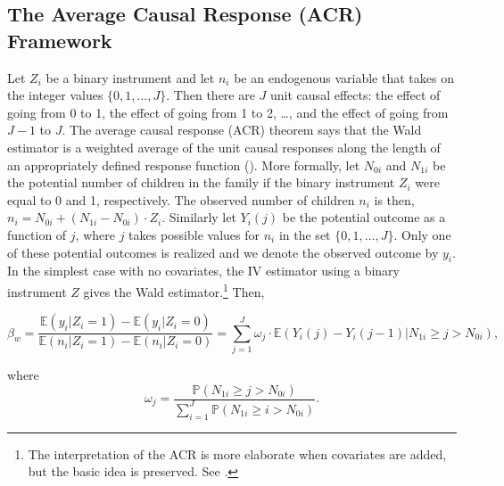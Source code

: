 
\subsection{The Average Causal Response (ACR) Framework}
\label{section:acr-detail}

Let $ Z_{i} $ be a binary instrument and let $ n_{i} $ be an endogenous variable that takes on the integer values $ \{0, 1, \dots, J\} $. Then there are $ J $ unit causal effects: the effect of going from 0 to 1, the effect of going from 1 to 2, \dots, and the effect of going from $ J-1 $ to $ J $. The average causal response (ACR) theorem says that the Wald estimator is a weighted average of the unit causal responses along the length of an appropriately defined response function (\parencite{Angrist2009,Angrist1995}). More formally, let $ N_{0i} $ and $ N_{1i} $ be the potential number of children in the family if the binary instrument $ Z_{i} $ were equal to 0 and 1, respectively. The observed number of children $ n_{i} $ is then, $ n_{i} = N_{0i} + (N_{1i} - N_{0i})\cdot Z_{i} $. Similarly let $ Y_{i}(j) $ be the potential outcome as a function of $ j $, where $ j $ takes possible values for $ n_{i} $ in the set $ \{0, 1, \dots, J\} $. Only one of these potential outcomes is realized and we denote the observed outcome by $ y_{i} $. In the simplest case with no covariates, the IV estimator using a binary instrument $ Z $ gives the Wald estimator.\footnote{The interpretation of the ACR is more elaborate when covariates are added, but the basic idea is preserved. See \textcite[p.~437]{Angrist1995}.} Then,

\begin{equation}\label{eq:02}
	\beta_{w} = \dfrac{\mathbb{E}(y_{i} | Z_{i} = 1) - \mathbb{E}(y_{i} | Z_{i} = 0)}{\mathbb{E}(n_{i} | Z_{i} = 1) - \mathbb{E}(n_{i} | Z_{i} = 0)} = \sum_{j = 1}^{J} \omega_{j}\cdot \mathbb{E}(Y_{i}(j) - Y_{i}(j-1) | N_{1i} \geq j > N_{0i}),
\end{equation}

where
\begin{equation}\label{eq:03}
\omega_{j} = \dfrac{\mathbb{P}(N_{1i} \geq j > N_{0i})}{\sum_{i = 1}^{J} \mathbb{P}(N_{1i} \geq i > N_{0i})}.
\end{equation}
\vskip10pt

